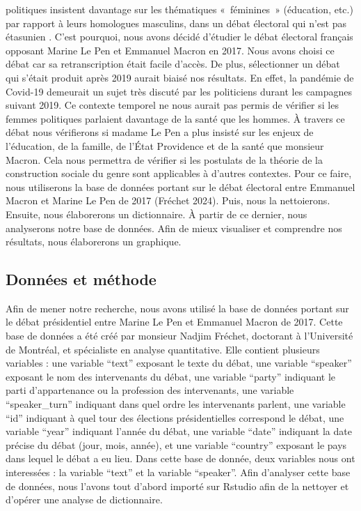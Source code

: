 \documentclass[
  letterpaper,
  DIV=11,
  numbers=noendperiod]{scrartcl}
\begin{document}
politiques insistent davantage sur les thématiques «~féminines~»
(éducation, etc.) par rapport à leurs homologues masculins, dans un
débat électoral qui n'est pas étasunien . C'est pourquoi, nous avons
décidé d'étudier le débat électoral français opposant Marine Le Pen et
Emmanuel Macron en 2017. Nous avons choisi ce débat car sa
retranscription était facile d'accès. De plus, sélectionner un débat qui
s'était produit après 2019 aurait biaisé nos résultats. En effet, la
pandémie de Covid-19 demeurait un sujet très discuté par les politiciens
durant les campagnes suivant 2019. Ce contexte temporel ne nous aurait
pas permis de vérifier si les femmes politiques parlaient davantage de
la santé que les hommes. À travers ce débat nous vérifierons si madame
Le Pen a plus insisté sur les enjeux de l'éducation, de la famille, de
l'État Providence et de la santé que monsieur Macron. Cela nous
permettra de vérifier si les postulats de la théorie de la construction
sociale du genre sont applicables à d'autres contextes. Pour ce faire,
nous utiliserons la base de données portant sur le débat électoral entre
Emmanuel Macron et Marine Le Pen de 2017 (Fréchet 2024). Puis, nous la
nettoierons. Ensuite, nous élaborerons un dictionnaire. À partir de ce
dernier, nous analyserons notre base de données. Afin de mieux
visualiser et comprendre nos résultats, nous élaborerons un graphique.~

\hypertarget{donnuxe9es-et-muxe9thode}{%
\subsection{Données et méthode}\label{donnuxe9es-et-muxe9thode}}

Afin de mener notre recherche, nous avons utilisé la base de données
portant sur le débat présidentiel entre Marine Le Pen et Emmanuel Macron
de 2017. Cette base de données a été créé par monsieur Nadjim Fréchet,
doctorant à l'Université de Montréal, et spécialiste en analyse
quantitative. Elle contient plusieurs variables : une variable ``text''
exposant le texte du débat, une variable ``speaker'' exposant le nom des
intervenants du débat, une variable ``party'' indiquant le parti
d'appartenance ou la profession des intervenants, une variable
``speaker\_turn'' indiquant dans quel ordre les intervenants parlent,
une variable ``id'' indiquant à quel tour des élections présidentielles
correspond le débat, une variable ``year'' indiquant l'année du débat,
une variable ``date'' indiquant la date précise du débat (jour, mois,
année), et une variable ``country'' exposant le pays dans lequel le
débat a eu lieu. Dans cette base de donnée, deux variables nous ont
interessées : la variable ``text'' et la variable ``speaker''. Afin
d'analyser cette base de données, nous l'avons tout d'abord importé sur
Rstudio afin de la nettoyer et d'opérer une analyse de dictionnaire.
\end{document}
